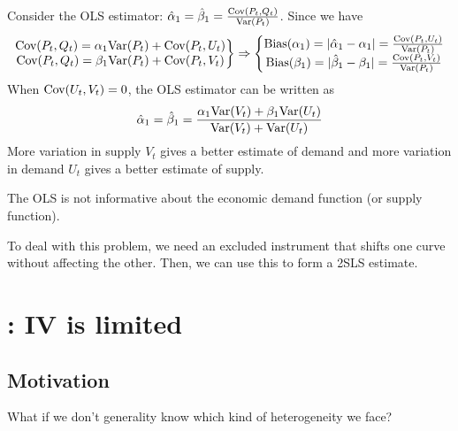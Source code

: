 \documentclass[11pt]{elegantbook}
\begin{document}
Consider the OLS estimator: $\hat{\alpha}_1=\hat{\beta}_1=\frac{\textnormal{Cov}(P_t,Q_t)}{\textnormal{Var}(P_t)}$. Since we have
\begin{equation}
    \begin{aligned}
        \left.\begin{matrix}
            \textnormal{Cov}(P_t,Q_t)=\alpha_1\textnormal{Var}(P_t)+\textnormal{Cov}(P_t,U_t)\\
            \textnormal{Cov}(P_t,Q_t)=\beta_1\textnormal{Var}(P_t)+\textnormal{Cov}(P_t,V_t)
        \end{matrix}\right\} \Rightarrow \left\{\begin{matrix}
            \textnormal{Bias}(\alpha_1)=|\hat{\alpha}_1-\alpha_1|=\frac{\textnormal{Cov}(P_t,U_t)}{\textnormal{Var}(P_t)}\\
            \textnormal{Bias}(\beta_1)=|\hat{\beta}_1-\beta_1|=\frac{\textnormal{Cov}(P_t,V_t)}{\textnormal{Var}(P_t)}\\
        \end{matrix}\right.
    \end{aligned}
    \nonumber
\end{equation}
When $\textnormal{Cov}(U_t,V_t)=0$, the OLS estimator can be written as
\begin{equation}
    \begin{aligned}
        \hat{\alpha}_1=\hat{\beta}_1=\frac{\alpha_1\textnormal{Var}(V_t)+\beta_1\textnormal{Var}(U_t)}{\textnormal{Var}(V_t)+\textnormal{Var}(U_t)}
    \end{aligned}
    \nonumber
\end{equation}
More variation in supply $V_t$ gives a better estimate of demand and more variation in demand $U_t$ gives a better estimate of supply.

The OLS is not informative about the economic demand function (or supply function).

To deal with this problem, we need an excluded instrument that shifts one curve without affecting the other. Then, we can use this to form a 2SLS estimate.


\section{\cite{angrist2000interpretation}: IV is limited}
\subsection{Motivation}
What if we don't generality know which kind of heterogeneity we face?
\end{document}
